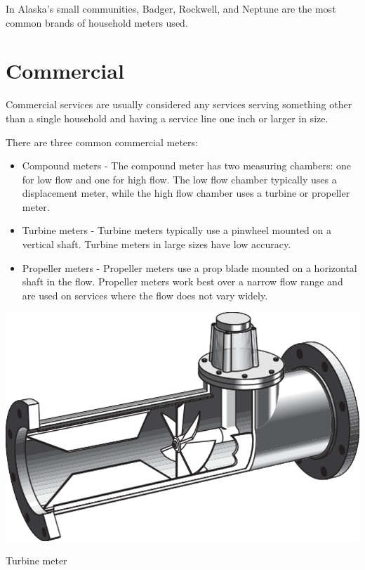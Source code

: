 \documentclass[10pt]{article}
\begin{document}
In Alaska's small communities, Badger, Rockwell, and Neptune are the most common brands of household meters used.

\section{Commercial}
Commercial services are usually considered any services serving something other than a single household and having a service line one inch or larger in size.

There are three common commercial meters:

\begin{itemize}
  \item Compound meters - The compound meter has two measuring chambers: one for low flow and one for high flow. The low flow chamber typically uses a displacement meter, while the high flow chamber uses a turbine or propeller meter.

  \item Turbine meters - Turbine meters typically use a pinwheel mounted on a vertical shaft. Turbine meters in large sizes have low accuracy.

  \item Propeller meters - Propeller meters use a prop blade mounted on a horizontal shaft in the flow. Propeller meters work best over a narrow flow range and are used on services where the flow does not vary widely.

\end{itemize}
\includegraphics[max width=\textwidth]{TurbineMeter}

Turbine meter
\end{document}
